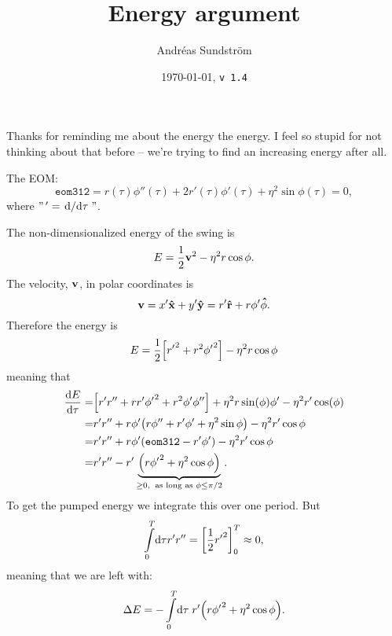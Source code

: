 \documentclass[11pt,letter, swedish, english
]{article}
\begin{document}
\title{\vspace{-2.5cm}Energy argument}
\author{Andréas Sundström}
\date{\today,\;\; \texttt{v\,1.4}}


\maketitle

Thanks for reminding me about the energy the energy. I feel so
stupid for not thinking about that before -- we're trying to find an
increasing energy after all. 

The EOM:
\begin{equation}
\mathtt{eom312}=r(\tau)\phi''(\tau)+2r'(\tau)\phi'(\tau) + \eta^2\sin\phi(\tau)=0,
\end{equation}
where $"\,'=\dv*{\tau}"$.

The non-dimensionalized energy of the swing is
\begin{equation}
E=\frac{1}{2}\vb{v}^2 - \eta^2 r \cos\phi.
\end{equation}
The velocity, $\vb{v}$, in polar coordinates is
\begin{equation}
\vb{v} = x'\vu{x}+y'\vu{y} = r'\vu{r}+r\phi'\vu{\phi}.
\end{equation}
Therefore the energy is
\begin{equation}
E=\frac{1}{2}\qty[{r'}^2 + {r}^2{\phi'}^2] - \eta^2 r \cos\phi
\end{equation}
meaning that
\begin{equation}\label{eq:dE/dtau1}
\begin{aligned}
\dv{E}{\tau}=& \qty[r'r'' + rr'{\phi'}^2+r^2\phi'\phi'']
+ \eta^2r\sin(\phi)\phi' - \eta^2r'\cos(\phi)
\\
=&r'r''+r\phi'\qty(r\phi'' + r'\phi' + \eta^2\sin\phi) 
-\eta^2r'\cos\phi
\\
=&r'r''+r\phi'\qty(\mathtt{eom312}-r'\phi') -\eta^2r'\cos\phi
\\
=&r'r'' 
- r'\underbrace{\qty(r{\phi'}^2 + \eta^2\cos\phi)
}_{\ge0,\;\;\text{as long as } \phi\le\pi/2}.
\end{aligned}
\end{equation}
To get the pumped energy we integrate this over one
period\footnotemark{}. But
\begin{equation}
\int_0^T\!\rd\tau r' r''=\qty[\frac{1}{2}{r'}^2]_0^T\approx0,
\end{equation}
meaning that we are left with:
\begin{equation}\label{eq:int_dE1}
\Delta{E}=-\int_0^T\!\rd\tau\;
r'\qty(r{\phi'}^2 + \eta^2\cos\phi).
\end{equation}
\end{document}
